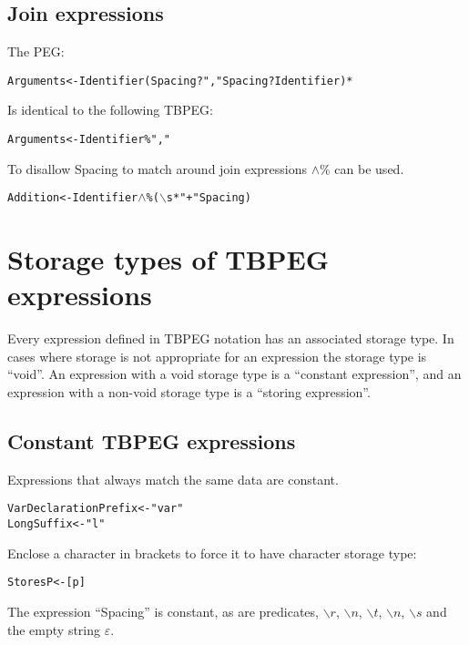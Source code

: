 \documentclass[a4paper,11pt]{article}
\begin{document}
\subsection{Join expressions}
The PEG:
\begin{alltt}
    Arguments <- Identifier (Spacing? "," Spacing? Identifier)*
\end{alltt}

Is identical to the following TBPEG:
\begin{alltt}
    Arguments <- Identifier \% ","
\end{alltt}

To disallow Spacing to match around join expressions $\wedge \%$ can be used.
\begin{alltt}
    Addition <- Identifier \(\wedge\)\% (\(\backslash\)s* "+" Spacing)
\end{alltt}

\section{Storage types of TBPEG expressions}
Every expression defined in TBPEG notation has an associated storage type.
In cases where storage is not appropriate for an expression the storage type is ``void''.
An expression with a void storage type is a ``constant expression'', and an expression with a non-void storage type is a ``storing expression''.

\subsection{Constant TBPEG expressions}
Expressions that always match the same data are constant.
\begin{alltt}
    VarDeclarationPrefix <- "var"
    LongSuffix           <- "l"
\end{alltt}

Enclose a character in brackets to force it to have character storage type:
\begin{alltt}
    StoresP <- [p]
\end{alltt}

The expression ``Spacing'' is constant, as are predicates, $\backslash r$, $\backslash n$, $\backslash t$, $\backslash n$, $\backslash s$ and the empty string $\varepsilon$.

\end{document}
